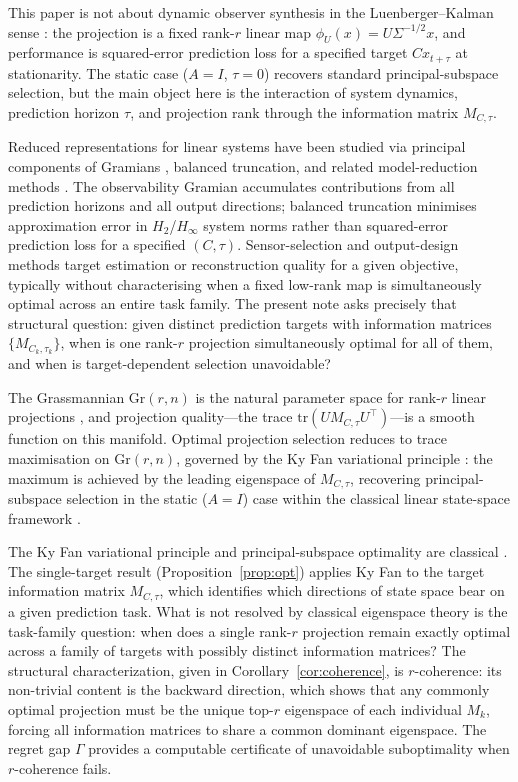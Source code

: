 \documentclass[final,3p,times]{elsarticle}
\newcommand{\Gr}{\mathrm{Gr}}
\newcommand{\tr}{\mathrm{tr}}
\begin{document}
This paper is not about dynamic observer synthesis in the Luenberger--Kalman
sense \cite{Luenberger1971,OReilly1983,Kailath1980}: the projection is a fixed rank-$r$
linear map $\phi_U(x)=U\Sigma^{-1/2}x$, and performance is squared-error
prediction loss for a specified target $Cx_{t+\tau}$ at stationarity.
The static case ($A=I$, $\tau=0$) recovers standard principal-subspace
selection, but the main object here is the interaction of system dynamics,
prediction horizon $\tau$, and projection rank through the information matrix
$M_{C,\tau}$.

Reduced representations for linear systems have been studied via principal
components of Gramians \cite{Moore1981}, balanced truncation, and related
model-reduction methods \cite{Antoulas2005}.
The observability Gramian accumulates contributions from all prediction
horizons and all output directions; balanced truncation minimises
approximation error in $H_2$/$H_\infty$ system norms rather than
squared-error prediction loss for a specified $(C,\tau)$.
Sensor-selection and output-design methods target estimation or
reconstruction quality for a given objective, typically without
characterising when a fixed low-rank map is simultaneously optimal
across an entire task family.
The present note asks precisely that structural question: given distinct
prediction targets with information matrices $\{M_{C_k,\tau_k}\}$, when
is one rank-$r$ projection simultaneously optimal for all of them, and when
is target-dependent selection unavoidable?

The Grassmannian $\Gr(r,n)$ is the natural parameter space for rank-$r$
linear projections \cite{Edelman1998}, and projection quality---the trace
$\tr(U M_{C,\tau} U^\top)$---is a smooth function on this manifold.
Optimal projection selection reduces to trace maximisation on $\Gr(r,n)$,
governed by the Ky Fan variational principle \cite{Fan1949}: the maximum
is achieved by the leading eigenspace of $M_{C,\tau}$, recovering
principal-subspace selection \cite{Hotelling1933} in the static ($A=I$)
case within the classical linear state-space framework \cite{Kailath1980}.

The Ky Fan variational principle and principal-subspace optimality are
classical \cite{Fan1949,Hotelling1933}.
The single-target result (Proposition~\ref{prop:opt}) applies Ky Fan to the
target information matrix $M_{C,\tau}$, which identifies which directions of
state space bear on a given prediction task.
What is not resolved by classical eigenspace theory is the task-family
question: when does a single rank-$r$ projection remain exactly optimal across
a family of targets with possibly distinct information matrices?
The structural characterization, given in Corollary~\ref{cor:coherence}, is
$r$-coherence: its non-trivial content is the backward direction, which
shows that any commonly optimal projection must be the unique top-$r$ eigenspace
of each individual $M_k$, forcing all information matrices to share a common
dominant eigenspace.
The regret gap $\Gamma$ provides a computable certificate of unavoidable
suboptimality when $r$-coherence fails.
\end{document}
